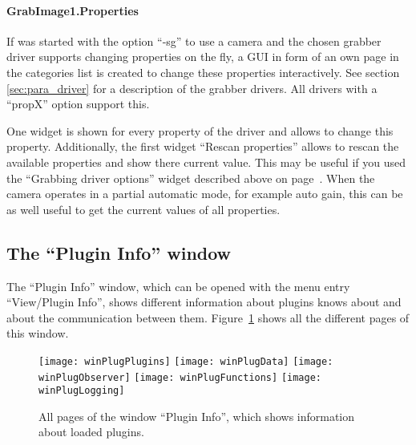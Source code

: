 \paragraph{GrabImage1.Properties}
If \icewing{} was started with the option ``-sg'' to use a camera
and the chosen grabber driver supports changing properties on the
fly, a GUI in form of an own page in the categories list is created
to change these properties interactively. See section
\ref{sec:para_driver} for a description of the grabber drivers. All
drivers with a ``propX'' option support this.

One widget is shown for every property of the driver and allows to
change this property. Additionally, the first widget ``Rescan
properties'' allows to rescan the available properties and show
there current value. This may be useful if you used the ``Grabbing
driver options'' widget described above on
page~\pageref{para:grabOptions}. When the camera operates in a
partial automatic mode, for example auto gain, this can be as well
useful to get the current values of all properties.

\subsection{The ``Plugin Info'' window}
\label{sub:PluginInfo}

The ``Plugin Info'' window, which can be opened with the menu entry
``View/Plugin Info'', shows different information about plugins
\icewing{} knows about and about the communication between them.
Figure~\ref{fig:windowPlugin} shows all the different pages of this
window.

\begin{figure}[ht]
  \begin{center}
    \texttt{[image: winPlugPlugins]}
    \texttt{[image: winPlugData]}
    \texttt{[image: winPlugObserver]}
    \texttt{[image: winPlugFunctions]}
    \texttt{[image: winPlugLogging]}
    \label{fig:windowPlugin}
  \end{center}
  \caption{All pages of the window ``Plugin Info'', which shows
    information about loaded plugins.}
\end{figure}

